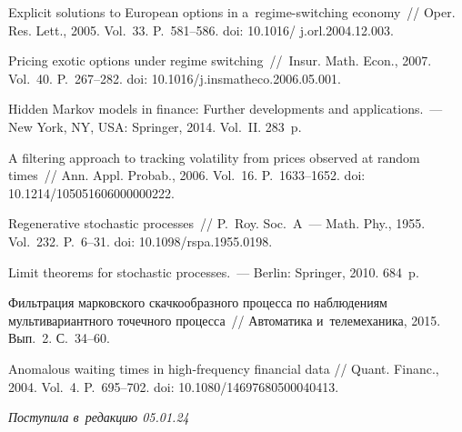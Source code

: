 \begin{multicols}{2}
{{\begin{thebibliography}{99}
Explicit solutions to European options in a~regime-switching economy~//
Oper. Res. Lett., 2005. Vol.~33. P.~581--586.
doi: 10.1016/ j.orl.2004.12.003.

Pricing exotic options under regime switching~//~Insur. Math. 
Econ., 2007. Vol.~40. P.~267--282.
doi: 10.1016/j.insmatheco.2006.05.001.

Hidden Markov models in finance: Further developments and applications.~--- New York, NY, USA: Springer,  2014.  Vol.~II. 283~p.

A filtering approach to tracking volatility from prices observed at
  random times~// Ann. Appl. Probab., 2006. Vol.~16. P.~1633--1652. doi: 
10.1214/105051606000000222.

Regenerative stochastic processes~//
P.~Roy. Soc.~A~--- Math. Phy., 1955. Vol.~232. P.~6--31. doi: 
10.1098/rspa.1955.0198.

 Limit theorems for stochastic processes.~--- Berlin: 
Springer, 2010. 684~p.

 Фильтрация марковского скачкообразного 
процесса по наблюдениям мультивариантного точечного процесса~// Автоматика и~телемеханика, 2015. Вып.~2. С.~34--60.

 Anomalous waiting times in high-frequency financial data //
 Quant. Financ., 2004. Vol.~4. P.~695--702.
doi: 10.1080/14697680500040413.
\end{thebibliography}

 }
 }

\end{multicols}

\vspace*{-6pt}

\hfill{\small\textit{Поступила в~редакцию 05.01.24}}

\vspace*{10pt}




